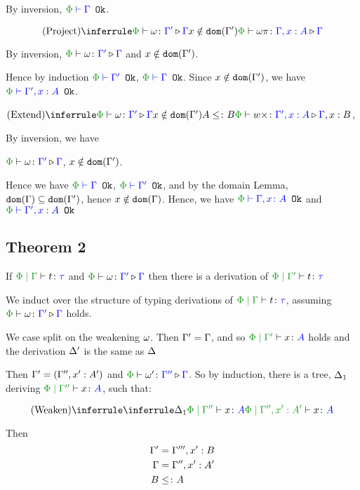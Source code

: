 {    By inversion, $\wellformedok{\P}{\G}$.

    $$\ntreeruleII{Project}{\pewrel{\w}{\G'}{\G}}{ x \notin \dom{\G'}}{\pewrel{\w \pi}{\G, x: A}{\G}}$$

    By inversion, $\pewrel{\w}{\G'}{\G}$ and $x\notin \texttt{dom}(\Gamma')$.

    Hence by induction $\wellformedok{\P}{\G'}$, $\wellformedok{\P}{\G}$. Since $x\notin\texttt{dom}(\Gamma')$, we have $\wellformedok{\P}{\G', x:A}$.

    $\ntreeruleIII{Extend}{\pewrel{\w}{\G'}{\G}}{ x \notin \dom{\G'}}{ A \subtype B}{\pewrel{w \x}{\G', x: A}{\G, x: B}}$, 

    By inversion, we have 

    $\pewrel{\w}{\G'}{\G}$, $x\notin\texttt{dom}(\Gamma')$.

    Hence we have $\wellformedok{\P}{\G}$, $\wellformedok{\P}{\G'}$, and by the domain Lemma, $\texttt{dom}(\Gamma)\subseteq\texttt{dom}(\Gamma')$, hence $x\notin\texttt{dom}(\Gamma)$. Hence, we have $\wellformedok{\P}{\gax}$ and $\wellformedok{\P}{\G',x:A}$


    \subsection{Theorem 2}
    If $\gpetyperelation{t}{\tau}$ and $\pewrel{\w}{\G'}{\G}$ then there is a derivation of $\etyperelation{\P}{\G'}{t}{\tau}$

    \proof

    We induct over the structure of typing derivations of $\gpetyperelation{t}{\tau}$, assuming $\pewrel{\w}{\G'}{\G}$ holds.

        We case split on the weakening $\omega$.
        \subcase{$\w = \i$}
        Then $\Gamma' = \Gamma$, and so $\etyperelation{\P}{\G'}{x}{A}$ holds and the derivation $\Delta'$ is the same as $\Delta$


        Then  $\Gamma' = (\Gamma'',x': A')$ and $\pewrel{\w'}{\G''}{\G}$. So by induction, there is a tree, $\Delta_1$ deriving $\etyperelation{\P}{\G''}{x}{A}$,  such that:
        
        \begin{equation}
            \ntreeruleI{Weaken}{\treeruleI{\D_1}{\etyperelation{\P}{\G''}{x}{A}}}{\etyperelation{\P}{\G'', x':A' }{x}{A}}
        \end{equation}

        Then 
        \begin{align}
            \Gamma' & = \Gamma''', x': B\\
            \Gamma &= \Gamma'', x': A'\\
            B & \leq\colon A
        \end{align}

}
